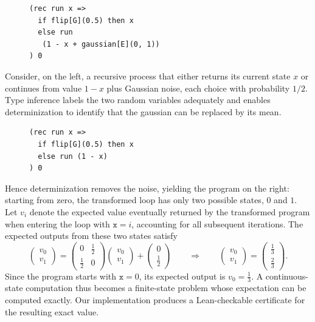 \begin{figure}
\vspace{-1.75em}
\begin{lstlisting}[xleftmargin=0pt]
(rec run x =>
  if flip[G](0.5) then x
  else run
   (1 - x + gaussian[E](0, 1))
) 0
\end{lstlisting}
\vspace{-1.75em}
\end{figure}
Consider, on the left, a recursive process that either returns
its current state $x$ or continues from value $1-x$ plus Gaussian
noise, each choice with probability $1/2$. Type inference labels the two random variables adequately and enables determinization to identify that the gaussian can be replaced by its mean.

\begin{figure}
\vspace{-1.75em}
\begin{lstlisting}[xleftmargin=0pt]
(rec run x =>
  if flip[G](0.5) then x
  else run (1 - x)
) 0
\end{lstlisting}
\vspace{-1.75em}
\end{figure}
 Hence determinization removes the noise, yielding the program on the right: starting from zero, the transformed loop has only two possible states, $0$ and $1$.
Let $v_i$ denote the expected value eventually returned by the
transformed program when entering the loop with $\texttt{x}=i$,
accounting for all subsequent iterations. The expected outputs
from these two states satisfy
\[
 \begin{pmatrix}v_0\\v_1\end{pmatrix}
 =\begin{pmatrix}0&\tfrac12\\\tfrac12&0\end{pmatrix}
  \begin{pmatrix}v_0\\v_1\end{pmatrix}
  +\begin{pmatrix}0\\\tfrac12\end{pmatrix}
 \qquad\Longrightarrow\qquad
 \begin{pmatrix}v_0\\v_1\end{pmatrix}
 =\begin{pmatrix}\tfrac13\\\tfrac23\end{pmatrix}.
\]
Since the program starts with $\texttt{x}=0$, its expected
output is $v_0=\tfrac13$.
A continuous-state computation thus becomes a finite-state
problem whose expectation can be computed exactly. Our implementation produces a Lean-checkable certificate for the resulting exact value.

